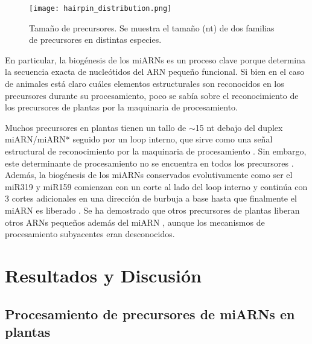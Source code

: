 \begin{figure}[htbp!] 
    \centering    
    \texttt{[image: hairpin\_distribution.png]}
    \caption[Tamaño de precursores]{Tamaño de precursores. Se muestra el tamaño (nt) de dos familias de precursores en distintas especies.}
    \label{fig:hairpin_distribution}
\end{figure}

En particular, la biogénesis de los miARNs es un proceso clave porque determina la secuencia exacta de nucleótidos del ARN pequeño funcional.
Si bien en el caso de animales está claro cuáles elementos estructurales son reconocidos en los precursores durante su procesamiento, poco se sabía sobre el reconocimiento de los precursores de plantas por la maquinaria de procesamiento.

Muchos precursores en plantas tienen un tallo de $\sim$15 nt debajo del duplex miARN/miARN* seguido por un loop interno, que sirve como una señal estructural de reconocimiento por la maquinaria de procesamiento \citep{pmid17369351,pmid16751099,Mateos2010,pmid20015654}.
Sin embargo, este determinante de procesamiento no se encuentra en todos los precursores \citep{Mateos2010}.
Además, la biogénesis de los miARNs conservados evolutivamente como ser el miR319 y miR159 comienzan con un corte al lado del loop interno y continúa con 3 cortes adicionales en una dirección de burbuja a base hasta que finalmente el miARN es liberado \citep{Bologna2013,pmid19850910}.
Se ha demostrado que otros precursores de plantas liberan otros ARNs pequeños además del miARN \citep{pmid15314213,pmid20696037}, aunque los mecanismos de procesamiento subyacentes eran desconocidos.

\section{Resultados y Discusión}


\subsection{Procesamiento de precursores de miARNs en plantas}
\label{sec:procesamiento}

